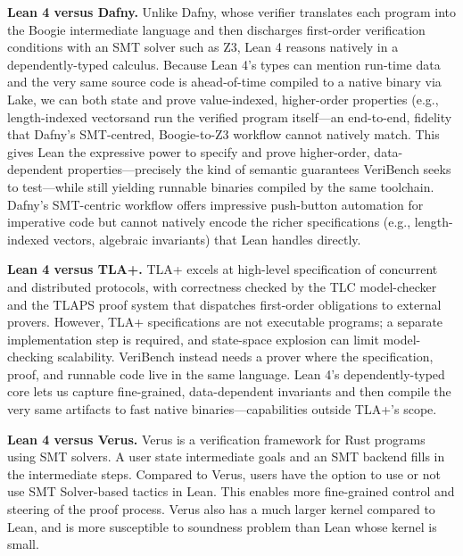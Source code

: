 \documentclass{article}
\begin{document}
\textbf{Lean 4 versus Dafny.}
Unlike Dafny, whose verifier translates each program into the Boogie intermediate language and then discharges first-order verification conditions with an SMT solver such as Z3, Lean 4 reasons natively in a dependently-typed calculus.
Because Lean 4’s types can mention run-time data and the very same source code is ahead-of-time compiled to a native binary via Lake, we can both state and prove value-indexed, higher-order properties (e.g., length-indexed vectorsand run the verified program itself—an end-to-end, fidelity that Dafny’s SMT-centred, Boogie-to-Z3 workflow cannot natively match.
This gives Lean the expressive power to specify and prove higher-order, data-dependent properties—precisely the kind of semantic guarantees VeriBench seeks to test—while still yielding runnable binaries compiled by the same toolchain.
Dafny’s SMT-centric workflow offers impressive push-button automation for imperative code but cannot natively encode the richer specifications (e.g., length-indexed vectors, algebraic invariants) that Lean handles directly.


\textbf{Lean 4 versus TLA+.}
TLA+ excels at high-level specification of concurrent and distributed protocols, with correctness checked by the TLC model-checker and the TLAPS proof system that dispatches first-order obligations to external provers. %
However, TLA+ specifications are not executable programs; a separate implementation step is required, and state-space explosion can limit model-checking scalability.
VeriBench instead needs a prover where the specification, proof, and runnable code live in the same language.
Lean 4’s dependently-typed core lets us capture fine-grained, data-dependent invariants and then compile the very same artifacts to fast native binaries—capabilities outside TLA+’s scope.

\textbf{Lean 4 versus Verus.}
Verus is a verification framework for Rust programs using SMT solvers. A user state intermediate goals and an SMT backend fills in the intermediate steps. Compared to Verus, users have the option to use or not use SMT Solver-based tactics in Lean. This enables more fine-grained control and steering of the proof process. Verus also has a much larger kernel compared to Lean, and is more susceptible to soundness problem than Lean whose kernel is small.
\end{document}
